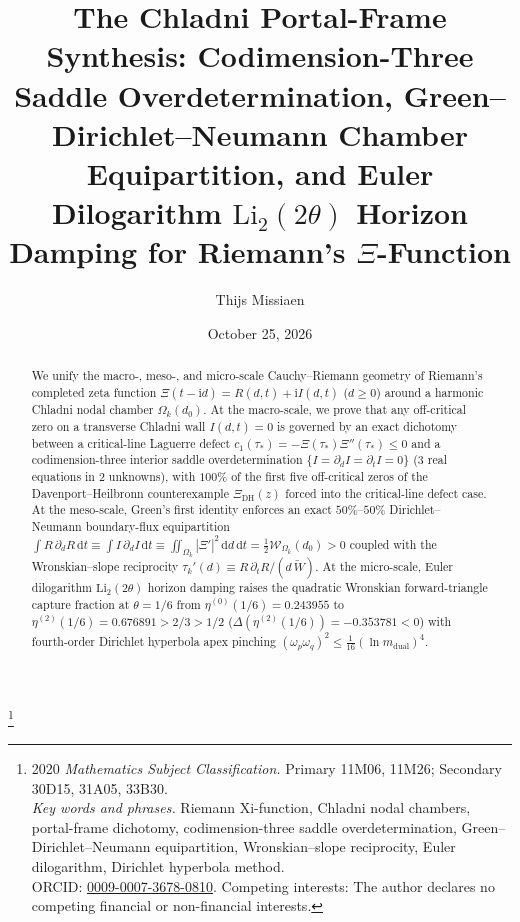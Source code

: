 \documentclass[11pt,reqno]{amsart}
\theoremstyle{definition}
\theoremstyle{remark}
\numberwithin{equation}{section}
\newcommand{\dd}{\mathrm{d}}
\newcommand{\ii}{\mathrm{i}}
\newcommand{\Li}{\mathrm{Li}}
\newcommand{\DHf}{\mathrm{DH}}
\newcommand{\dual}{\mathrm{dual}}
\begin{document}
\sloppy

\title[The Chladni Portal-Frame Synthesis for Riemann's $\Xi$-Function]{The Chladni Portal-Frame Synthesis: Codimension-Three Saddle Overdetermination, Green--Dirichlet--Neumann Chamber Equipartition, and Euler Dilogarithm $\mathrm{Li}_2(2\theta)$ Horizon Damping for Riemann's $\Xi$-Function}

\author{Thijs Missiaen}
\address{Independent Researcher, Belgium}
\thanks{2020 \emph{Mathematics Subject Classification.} Primary 11M06, 11M26; Secondary 30D15, 31A05, 33B30.\\
\emph{Key words and phrases.} Riemann Xi-function, Chladni nodal chambers, portal-frame dichotomy, codimension-three saddle overdetermination, Green--Dirichlet--Neumann equipartition, Wronskian--slope reciprocity, Euler dilogarithm, Dirichlet hyperbola method.\\
ORCID: \href{https://orcid.org/0009-0007-3678-0810}{0009-0007-3678-0810}. Competing interests: The author declares no competing financial or non-financial interests.}

\date{October 25, 2026}

\begin{abstract}
We unify the macro-, meso-, and micro-scale Cauchy--Riemann geometry of Riemann's completed zeta function $\Xi(t-\ii d)=R(d,t)+\ii I(d,t)$ ($d\ge 0$) around a harmonic Chladni nodal chamber $\Omega_k(d_0)$. At the macro-scale, we prove that any off-critical zero on a transverse Chladni wall $I(d,t)=0$ is governed by an exact dichotomy between a critical-line Laguerre defect $c_1(\tau_*)=-\Xi(\tau_*)\Xi''(\tau_*)\le 0$ and a codimension-three interior saddle overdetermination $\{I=\partial_d I=\partial_t I=0\}$ ($3$ real equations in $2$ unknowns), with $100\%$ of the first five off-critical zeros of the Davenport--Heilbronn counterexample $\Xi_{\DHf}(z)$ forced into the critical-line defect case. At the meso-scale, Green's first identity enforces an exact $50\%$--$50\%$ Dirichlet--Neumann boundary-flux equipartition $\int R\,\partial_d R\,\dd t \equiv \int I\,\partial_d I\,\dd t \equiv \iint_{\Omega_k}|\Xi'|^2\,\dd d\,\dd t = \frac{1}{2}\mathcal{W}_{\Omega_k}(d_0)>0$ coupled with the Wronskian--slope reciprocity $\tau_k'(d)\equiv R\,\partial_t R/(d\,\widetilde{W})$. At the micro-scale, Euler dilogarithm $\Li_2(2\theta)$ horizon damping raises the quadratic Wronskian forward-triangle capture fraction at $\theta=1/6$ from $\eta^{(0)}(1/6)=0.243955$ to $\eta^{(2)}(1/6)=0.676891>2/3>1/2$ ($\Delta(\eta^{(2)}(1/6))=-0.353781<0$) with fourth-order Dirichlet hyperbola apex pinching $(\omega_p\omega_q)^2\le \frac{1}{16}(\ln m_{\dual})^4$.
\end{abstract}
\end{document}
